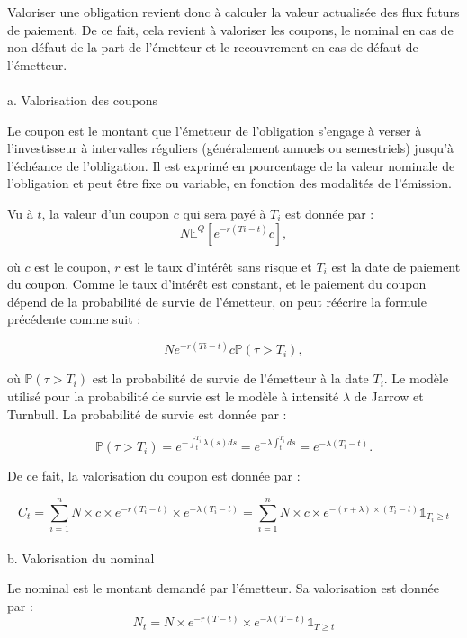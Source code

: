 \documentclass[
  letterpaper,
  DIV=11,
  numbers=noendperiod]{scrartcl}
\makeatletter
\let\oldparagraph\paragraph
\renewcommand{\paragraph}{
    \@ifstar
      \xxxParagraphStar
      \xxxParagraphNoStar
  }
\newcommand{\xxxParagraphStar}[1]{\oldparagraph*{#1}\mbox{}}
\newcommand{\xxxParagraphNoStar}[1]{\oldparagraph{#1}\mbox{}}
\makeatother
\begin{document}
Valoriser une obligation revient donc à calculer la valeur actualisée
des flux futurs de paiement. De ce fait, cela revient à valoriser les
coupons, le nominal en cas de non défaut de la part de l'émetteur et le
recouvrement en cas de défaut de l'émetteur.

\paragraph{a. Valorisation des
coupons}\label{a.-valorisation-des-coupons}

Le coupon est le montant que l'émetteur de l'obligation s'engage à
verser à l'investisseur à intervalles réguliers (généralement annuels ou
semestriels) jusqu'à l'échéance de l'obligation. Il est exprimé en
pourcentage de la valeur nominale de l'obligation et peut être fixe ou
variable, en fonction des modalités de l'émission.

Vu à \(t\), la valeur d'un coupon \(c\) qui sera payé à \(T_i\) est
donnée par : \[
N \mathbb{E}^Q \left[ e^{-r(Ti-t)} c \right],
\]

où \(c\) est le coupon, \(r\) est le taux d'intérêt sans risque et
\(T_i\) est la date de paiement du coupon. Comme le taux d'intérêt est
constant, et le paiement du coupon dépend de la probabilité de survie de
l'émetteur, on peut réécrire la formule précédente comme suit :

\[
N e^{-r(Ti-t)} c \mathbb{P}(\tau > T_i),
\]

où \(\mathbb{P}(\tau > T_i)\) est la probabilité de survie de l'émetteur
à la date \(T_i\). Le modèle utilisé pour la probabilité de survie est
le modèle à intensité \(\lambda\) de Jarrow et Turnbull. La probabilité
de survie est donnée par :

\[
\mathbb{P}(\tau > T_i) = e^{-\int_{t}^{T_i} \lambda(s) ds} = e^{-\lambda \int_{t}^{T_i} ds} = e^{-\lambda (T_i - t)}.
\]

De ce fait, la valorisation du coupon est donnée par :

\[
C_{t} = \sum_{i=1}^{n} N \times c \times e^{-r(T_i-t)} \times e^{-\lambda (T_i - t)} = \sum_{i=1}^{n} N \times c \times e^{-(r + \lambda) \times (T_i-t)} \mathbb{1}_{T_i \geq t}
\]

\paragraph{b. Valorisation du nominal}\label{b.-valorisation-du-nominal}

Le nominal est le montant demandé par l'émetteur. Sa valorisation est
donnée par : \[
N_t = N \times e^{-r(T-t)} \times e^{-\lambda (T-t)} \mathbb{1}_{T \geq t}
\]
\end{document}

